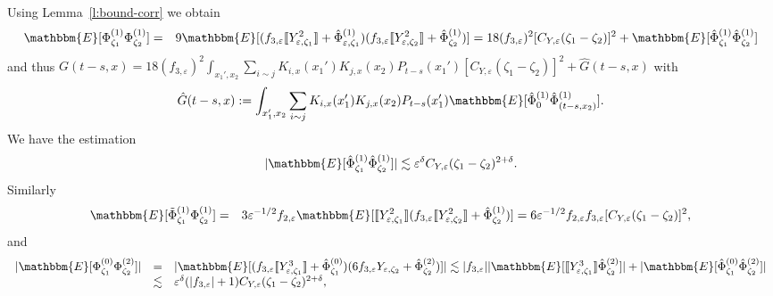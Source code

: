 \documentclass[a4paper,11pt]{article}
\newcommand{\assign}{:=}
\begin{document}
Using Lemma~\ref{l:bound-corr} we obtain
\begin{eqnarray*}
  \mathbbm{E} [\Phi^{(1)}_{\zeta_1} \Phi^{(1)}_{\zeta_2}] & = & 9\mathbbm{E}
  [(f_{3, \varepsilon} \llbracket Y^2_{\varepsilon, \zeta_1} \rrbracket +
  \hat{\Phi}^{(1)}_{\varepsilon, \zeta_1}) (f_{3, \varepsilon} \llbracket
  Y^2_{\varepsilon, \zeta_2} \rrbracket + \hat{\Phi}^{(1)}_{\zeta_2})] = 18
  (f_{3, \varepsilon})^2  [C_{Y, \varepsilon} (\zeta_1 - \zeta_2)]^2
  +\mathbbm{E} [\hat{\Phi}^{(1)}_{\zeta_1} \hat{\Phi}^{(1)}_{\zeta_2}]
\end{eqnarray*}
and thus $G (t - s, x) = 18 (f_{3, \varepsilon})^2 \int_{x_1', x_2}  \sum_{i
\sim j} K_{i, x} (x_1') K_{j, x} (x_2) P_{t - s} (x_1') [C_{Y, \varepsilon}
(\zeta_1 - \zeta_2)]^2 + \hat{G} (t - s, x)$ with
\[ \hat{G} (t - s, x) \assign \int_{x_1', x_2}  \sum_{i \sim j} K_{i, x}
   (x_1') K_{j, x} (x_2) P_{t - s} (x_1') \mathbbm{E} [\hat{\Phi}^{(1)}_0
   \hat{\Phi}^{(1)}_{(t - s, x_2)}] . \]
We have the estimation
\begin{equation}
  | \mathbbm{E} [\hat{\Phi}^{(1)}_{\zeta_1} \hat{\Phi}^{(1)}_{\zeta_2}] |
  \lesssim \varepsilon^{\delta} C_{Y, \varepsilon} (\zeta_1 - \zeta_2)^{2 +
  \delta} . \label{e:bound-corr-11}
\end{equation}
Similarly
\begin{eqnarray*}
  \mathbbm{E} [\tilde{\Phi}^{(1)}_{\zeta_1} \Phi^{(1)}_{\zeta_2}] & = & 3
  \varepsilon^{- 1 / 2} f_{2, \varepsilon} \mathbbm{E} [\llbracket
  Y^2_{\varepsilon, \zeta_1} \rrbracket (f_{3, \varepsilon} \llbracket
  Y^2_{\varepsilon, \zeta_2} \rrbracket + \hat{\Phi}^{(1)}_{\zeta_2})] = 6
  \varepsilon^{- 1 / 2} f_{2, \varepsilon} f_{3, \varepsilon} [C_{Y,
  \varepsilon} (\zeta_1 - \zeta_2)]^2,
\end{eqnarray*}
and
\begin{equation}
  \begin{array}{lll}
    | \mathbbm{E} [\Phi^{(0)}_{\zeta_1} \Phi^{(2)}_{\zeta_2}] | & = & |
    \mathbbm{E} [(f_{3, \varepsilon} \llbracket Y^3_{\varepsilon, \zeta_1}
    \rrbracket + \hat{\Phi}^{(0)}_{\zeta_1}) (6 f_{3, \varepsilon}
    Y_{\varepsilon, \zeta_2} + \hat{\Phi}^{(2)}_{\zeta_2})] | \lesssim | f_{3,
    \varepsilon} | | \mathbbm{E} [\llbracket Y^3_{\varepsilon, \zeta_1}
    \rrbracket \hat{\Phi}^{(2)}_{\zeta_2}] | + | \mathbbm{E}
    [\hat{\Phi}^{(0)}_{\zeta_1} \hat{\Phi}^{(2)}_{\zeta_2}] |\\
    & \lesssim & \varepsilon^{\delta} (| f_{3, \varepsilon} | + 1) C_{Y,
    \varepsilon} (\zeta_1 - \zeta_2)^{2 + \delta},
  \end{array} \label{e:bound-corr-02}
\end{equation}
\end{document}

